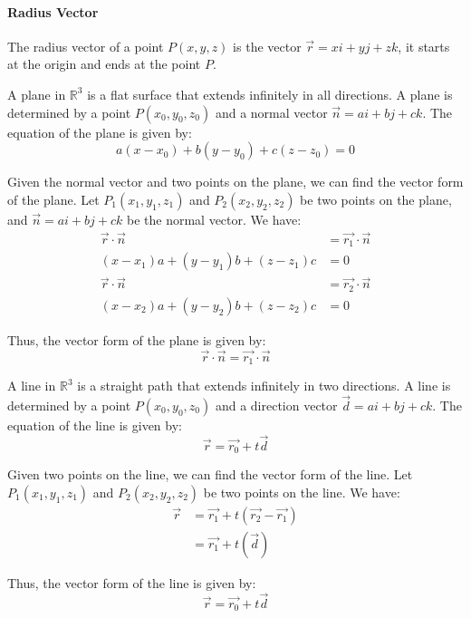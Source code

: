 \documentclass[11pt]{article}
\begin{document}
\paragraph{Radius Vector} The radius vector of a point $P(x, y, z)$ is the vector $\vec{r} = xi + yj + zk$, it starts at the origin and ends at the point $P$.
\begin{definition}[Planes]
    A plane in $\mathbb{R}^3$ is a flat surface that extends infinitely in all directions. A plane is determined by a point $P(x_0, y_0, z_0)$ and a normal vector $\vec{n} = ai + bj + ck$. The equation of the plane is given by:
    \begin{equation}
        a(x-x_0) + b(y-y_0) + c(z-z_0) = 0
    \end{equation}
\end{definition}
\begin{example}
    Given the normal vector and two points on the plane, we can find the vector form of the plane. Let $P_1(x_1, y_1, z_1)$ and $P_2(x_2, y_2, z_2)$ be two points on the plane, and $\vec{n} = ai + bj + ck$ be the normal vector. We have:
    \begin{align*}
        \vec{r} \cdot \vec{n} &= \vec{r_1} \cdot \vec{n} \\
        (x-x_1)a + (y-y_1)b + (z-z_1)c &= 0 \\
        \vec{r} \cdot \vec{n} &= \vec{r_2} \cdot \vec{n} \\
        (x-x_2)a + (y-y_2)b + (z-z_2)c &= 0
    \end{align*}
\end{example}
Thus, the vector form of the plane is given by:
\begin{equation}
    \vec{r} \cdot \vec{n} = \vec{r_1} \cdot \vec{n}
\end{equation}
\begin{definition}[Lines]
    A line in $\mathbb{R}^3$ is a straight path that extends infinitely in two directions. A line is determined by a point $P(x_0, y_0, z_0)$ and a direction vector $\vec{d} = ai + bj + ck$. The equation of the line is given by:
    \begin{equation}
        \vec{r} = \vec{r_0} + t\vec{d}
    \end{equation}
\end{definition}
\begin{example}
    Given two points on the line, we can find the vector form of the line. Let $P_1(x_1, y_1, z_1)$ and $P_2(x_2, y_2, z_2)$ be two points on the line. We have:
    \begin{align*}
        \vec{r} &= \vec{r_1} + t(\vec{r_2} - \vec{r_1}) \\
        &= \vec{r_1} + t(\vec{d})
    \end{align*}
\end{example}
    Thus, the vector form of the line is given by:
    \begin{equation}
        \vec{r} = \vec{r_0} + t\vec{d}
    \end{equation}
\end{document}
